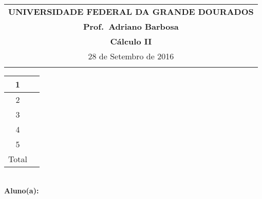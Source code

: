 \documentclass[a4paper,5pt]{amsbook}
\begin{document}
\thispagestyle{empty}
\begin{minipage}[b]{0.45\linewidth}
\begin{tabular}{c}
\toprule{}
{{\bf UNIVERSIDADE FEDERAL DA GRANDE DOURADOS}}\\
{{\bf Prof.\ Adriano Barbosa}}\\



{{\bf C\'alculo II}}\\

\midrule{}
\hspace{8cm}28 de Setembro de 2016 \\
\bottomrule{}
\end{tabular}
%
\end{minipage} \hfill
\begin{minipage}[b]{0.58\linewidth}
\begin{flushright}
\def\arraystretch{1.2}
\begin{tabular}{|c|c|}  %
\hline\hline  %
1 & \hspace{1.2cm} \\
\hline  %
2& \\
\hline  %
3& \\
\hline  %
4&  \\
\hline  %
5&  \\
\hline  %
{\small Total}&  \\
\hline\hline  %
\end{tabular}
\end{flushright}
\end{minipage} \hfill
\vspace{0.3cm}\\
{\bf Aluno(a):}\dotfill{} \\  %
\end{document}
